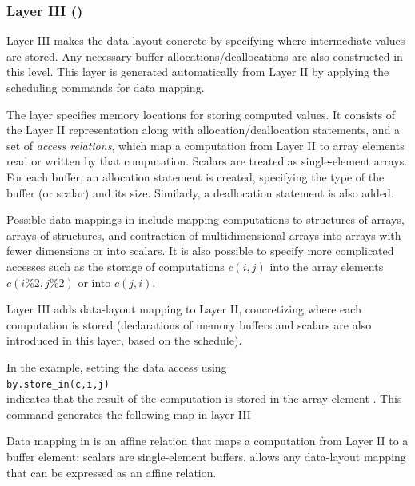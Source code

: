 \subsubsection{Layer III (\Layerthree)}
\label{layer3}

Layer III makes the data-layout concrete by specifying where intermediate values are stored.  Any necessary buffer allocations/deallocations are also constructed in this level.  This layer is generated automatically from Layer II by applying the scheduling commands for data mapping.

The \layerthree layer specifies memory locations for storing computed values.  It consists of the Layer II representation along with allocation/deallocation statements, and a set of \emph{access relations},
which map a computation from Layer II to array elements read or written by that computation.  Scalars are treated as single-element arrays.  %
For each buffer, an allocation statement is created, specifying the type of the buffer (or scalar) and its size.  Similarly, a deallocation statement is also added.

Possible data mappings in \framework include mapping computations to structures-of-arrays, arrays-of-structures, and contraction of multidimensional arrays into arrays with fewer dimensions or into scalars.  It is also possible to specify more complicated accesses such as the storage of computations $c(i,j)$ into the array elements $c(i\%2,j\%2)$ or into $c(j,i)$.

Layer III adds data-layout mapping to Layer II, concretizing where each computation is stored (declarations of memory buffers and scalars are also introduced in this layer, based on the schedule).

In the example, setting the data access using\\ \texttt{by.store\_in({c,i,j})}\\
indicates that the result of the computation  is stored in the array element . This command generates the following map in layer III

\noindent
{}

Data mapping in \framework is an affine relation that maps a computation from Layer II to a buffer element; scalars are single-element buffers.  \framework allows any data-layout mapping that can be expressed as an affine relation.

